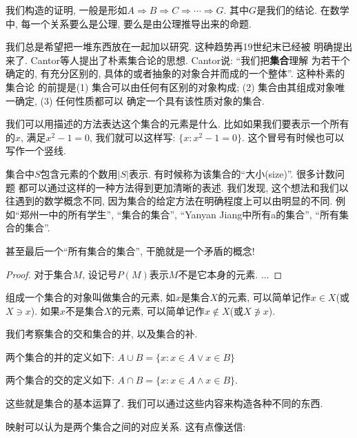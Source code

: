 我们构造的证明, 一般是形如$A\Rightarrow B\Rightarrow C \Rightarrow \cdots \Rightarrow G$.
其中$G$是我们的结论. 在数学中, 每一个关系要么是公理, 要么是由公理推导出来的命题. 

 我们总是希望把一堆东西放在一起加以研究. 这种趋势再19世纪末已经被
明确提出来了. Cantor等人提出了朴素集合论的思想. Cantor说: ``我们把\textbf{集合}理解
为若干个确定的, 有充分区别的, 具体的或者抽象的对象合并而成的一个整体''. 这种朴素的集合论
的前提是(1) 集合可以由任何有区别的对象构成; (2) 集合由其组成对象唯一确定, (3) 任何性质都可以
确定一个具有该性质对象的集合. 

我们可以用描述的方法表达这个集合的元素是什么. 比如如果我们要表示一个所有的$x$, 满足$x^2-1=0$,
我们就可以这样写: $\{x: x^2-1=0\}.$ 这个冒号有时候也可以写作一个竖线.

集合中$S$包含元素的个数用$|S|$表示. 有时候称为该集合的``大小(size)''. 很多计数问题
都可以通过这样的一种方法得到更加清晰的表述. 
我们发现, 这个想法和我们以往遇到的数学概念不同, 因为集合的给定方法在明确程度上可以由明显的不同. 
例如``郑州一中的所有学生'', ``集合的集合'', ``Yanyan Jiang中所有a的集合'', ``所有集合的集合''.

甚至最后一个``所有集合的集合'', 干脆就是一个矛盾的概念! 

\begin{proof}
    对于集合$M$, 设记号$P(M)$表示$M$不是它本身的元素. ...
\end{proof}

组成一个集合的对象叫做集合的元素, 如$x$是集合$X$的元素, 可以简单记作$x\in X$(或$X\ni x$). 
如果$x$不是集合$X$的元素, 可以简单记作$x\not \in X$(或$X\not\ni x$). 

 我们考察集合的交和集合的并, 以及集合的补. 

\begin{definition}
  两个集合的并的定义如下: $A\cup B=\{x:x\in A \lor x\in B\}$
\end{definition}

\begin{definition}
两个集合的交的定义如下: $A\cap B=\{x:x\in A \land x\in B\}$.
\end{definition}

这些就是集合的基本运算了. 我们可以通过这些内容来构造各种不同的东西. 


映射可以认为是两个集合之间的对应关系. 这有点像送信: 

